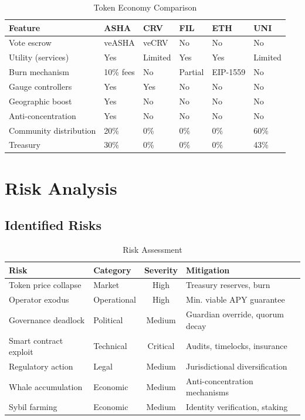 \documentclass[11pt,a4paper]{article}
\begin{document}
\begin{table}[H]
\centering
\caption{Token Economy Comparison}
\label{tab:compare}
\begin{tabularx}{\textwidth}{lXXXXX}
\toprule
\textbf{Feature} & \textbf{ASHA} & \textbf{CRV} & \textbf{FIL} & \textbf{ETH} & \textbf{UNI} \\
\midrule
Vote escrow & veASHA & veCRV & No & No & No \\
Utility (services) & Yes & Limited & Yes & Yes & Limited \\
Burn mechanism & 10\% fees & No & Partial & EIP-1559 & No \\
Gauge controllers & Yes & Yes & No & No & No \\
Geographic boost & Yes & No & No & No & No \\
Anti-concentration & Yes & No & No & No & No \\
Community distribution & 20\% & 0\% & 0\% & 0\% & 60\% \\
Treasury & 30\% & 0\% & 0\% & 0\% & 43\% \\
\bottomrule
\end{tabularx}
\end{table}

\section{Risk Analysis}

\subsection{Identified Risks}

\begin{table}[H]
\centering
\caption{Risk Assessment}
\label{tab:risks}
\begin{tabular}{llcl}
\toprule
\textbf{Risk} & \textbf{Category} & \textbf{Severity} & \textbf{Mitigation} \\
\midrule
Token price collapse & Market & High & Treasury reserves, burn \\
Operator exodus & Operational & High & Min. viable APY guarantee \\
Governance deadlock & Political & Medium & Guardian override, quorum decay \\
Smart contract exploit & Technical & Critical & Audits, timelocks, insurance \\
Regulatory action & Legal & Medium & Jurisdictional diversification \\
Whale accumulation & Economic & Medium & Anti-concentration mechanisms \\
Sybil farming & Economic & Medium & Identity verification, staking \\
\bottomrule
\end{tabular}
\end{table}
\end{document}
